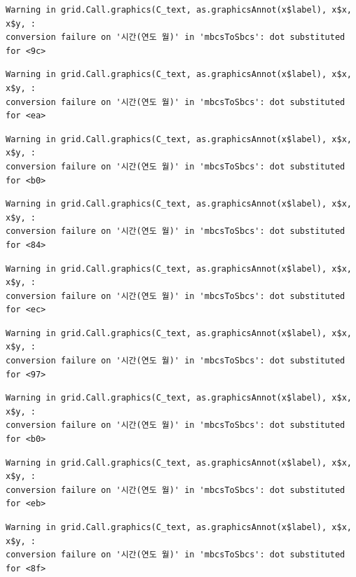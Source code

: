\documentclass[
  letterpaper,
  DIV=11,
  numbers=noendperiod]{scrreprt}
\begin{document}
\begin{verbatim}
Warning in grid.Call.graphics(C_text, as.graphicsAnnot(x$label), x$x, x$y, :
conversion failure on '시간(연도 월)' in 'mbcsToSbcs': dot substituted for <9c>
\end{verbatim}

\begin{verbatim}
Warning in grid.Call.graphics(C_text, as.graphicsAnnot(x$label), x$x, x$y, :
conversion failure on '시간(연도 월)' in 'mbcsToSbcs': dot substituted for <ea>
\end{verbatim}

\begin{verbatim}
Warning in grid.Call.graphics(C_text, as.graphicsAnnot(x$label), x$x, x$y, :
conversion failure on '시간(연도 월)' in 'mbcsToSbcs': dot substituted for <b0>
\end{verbatim}

\begin{verbatim}
Warning in grid.Call.graphics(C_text, as.graphicsAnnot(x$label), x$x, x$y, :
conversion failure on '시간(연도 월)' in 'mbcsToSbcs': dot substituted for <84>
\end{verbatim}

\begin{verbatim}
Warning in grid.Call.graphics(C_text, as.graphicsAnnot(x$label), x$x, x$y, :
conversion failure on '시간(연도 월)' in 'mbcsToSbcs': dot substituted for <ec>
\end{verbatim}

\begin{verbatim}
Warning in grid.Call.graphics(C_text, as.graphicsAnnot(x$label), x$x, x$y, :
conversion failure on '시간(연도 월)' in 'mbcsToSbcs': dot substituted for <97>
\end{verbatim}

\begin{verbatim}
Warning in grid.Call.graphics(C_text, as.graphicsAnnot(x$label), x$x, x$y, :
conversion failure on '시간(연도 월)' in 'mbcsToSbcs': dot substituted for <b0>
\end{verbatim}

\begin{verbatim}
Warning in grid.Call.graphics(C_text, as.graphicsAnnot(x$label), x$x, x$y, :
conversion failure on '시간(연도 월)' in 'mbcsToSbcs': dot substituted for <eb>
\end{verbatim}

\begin{verbatim}
Warning in grid.Call.graphics(C_text, as.graphicsAnnot(x$label), x$x, x$y, :
conversion failure on '시간(연도 월)' in 'mbcsToSbcs': dot substituted for <8f>
\end{verbatim}
\end{document}
